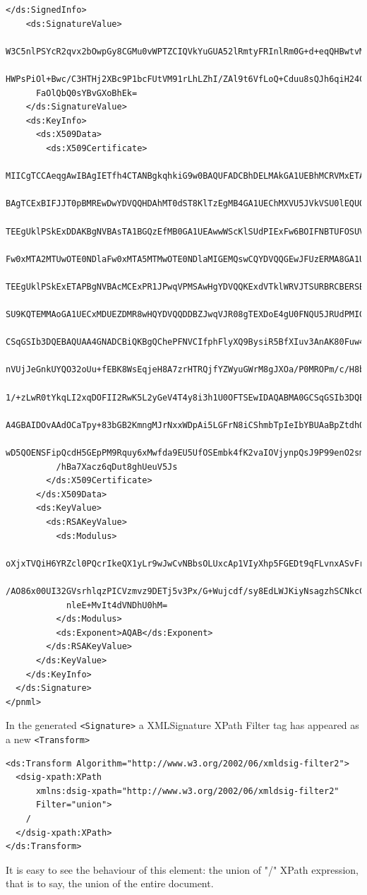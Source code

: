 \begin{lstlisting}[basicstyle=\ttfamily\tiny]
    </ds:SignedInfo>
    <ds:SignatureValue>
      W3C5nlPSYcR2qvx2bOwpGy8CGMu0vWPTZCIQVkYuGUA52lRmtyFRInlRm0G+d+eqQHBwtvMophte
      HWPsPiOl+Bwc/C3HTHj2XBc9P1bcFUtVM91rLhLZhI/ZAl9t6VfLoQ+Cduu8sQJh6qiH24CiYGjc
      FaOlQbQ0sYBvGXoBhEk=
    </ds:SignatureValue>
    <ds:KeyInfo>
      <ds:X509Data>
        <ds:X509Certificate>
          MIICgTCCAeqgAwIBAgIETfh4CTANBgkqhkiG9w0BAQUFADCBhDELMAkGA1UEBhMCRVMxETAPBgNV
          BAgTCExBIFJJT0pBMREwDwYDVQQHDAhMT0dST8KlTzEgMB4GA1UEChMXVU5JVkVSU0lEQUQgREUg
          TEEgUklPSkExDDAKBgNVBAsTA1BGQzEfMB0GA1UEAwwWScKlSUdPIExFw6BOIFNBTUFOSUVHTzAe
          Fw0xMTA2MTUwOTE0NDlaFw0xMTA5MTMwOTE0NDlaMIGEMQswCQYDVQQGEwJFUzERMA8GA1UECBMI
          TEEgUklPSkExETAPBgNVBAcMCExPR1JPwqVPMSAwHgYDVQQKExdVTklWRVJTSURBRCBERSBMQSBS
          SU9KQTEMMAoGA1UECxMDUEZDMR8wHQYDVQQDDBZJwqVJR08gTEXDoE4gU0FNQU5JRUdPMIGfMA0G
          CSqGSIb3DQEBAQUAA4GNADCBiQKBgQChePFNVCIfphFlyXQ9BysiR5BfXIuv3AnAK80Fuw4tTFwC
          nVUjJeGnkUYQO32oUu+fEBK8WsEqjeH8A7zrHTRQjfYZWyuGWrM8gJXOa/P0MROPm/c/H8b5a6Nx
          1/+zLwR0tYkqLI2xqDOFII2RwK5L2yGeV4T4y8i3h1U0OFTSEwIDAQABMA0GCSqGSIb3DQEBBQUA
          A4GBAIDOvAAdOCaTpy+83bGB2KmngMJrNxxWDpAi5LGFrN8iCShmbTpIeIbYBUAaBpZtdhOnhq4n
          wD5QOENSFipQcdH5GEpPM9Rquy6xMwfda9EU5UfOSEmbk4fK2vaIOVjynpQsJ9P99enO2smQlyvw
          /hBa7Xacz6qDut8ghUeuV5Js
        </ds:X509Certificate>
      </ds:X509Data>
      <ds:KeyValue>
        <ds:RSAKeyValue>
          <ds:Modulus>
            oXjxTVQiH6YRZcl0PQcrIkeQX1yLr9wJwCvNBbsOLUxcAp1VIyXhp5FGEDt9qFLvnxASvFrBKo3h
            /AO86x00UI32GVsrhlqzPICVzmvz9DETj5v3Px/G+Wujcdf/sy8EdLWJKiyNsagzhSCNkcCuS9sh
            nleE+MvIt4dVNDhU0hM=
          </ds:Modulus>
          <ds:Exponent>AQAB</ds:Exponent>
        </ds:RSAKeyValue>
      </ds:KeyValue>
    </ds:KeyInfo>
  </ds:Signature>
</pnml>
\end{lstlisting}

In the generated \texttt{<Signature>} a XMLSignature XPath Filter tag has
appeared as a new \texttt{<Transform>}

\begin{lstlisting} 
<ds:Transform Algorithm="http://www.w3.org/2002/06/xmldsig-filter2">
  <dsig-xpath:XPath
      xmlns:dsig-xpath="http://www.w3.org/2002/06/xmldsig-filter2"
      Filter="union">
    /
  </dsig-xpath:XPath>
</ds:Transform>
\end{lstlisting}

It is easy to see the behaviour of this element: the union of "/" XPath expression,
that is to say, the union of the entire document.

